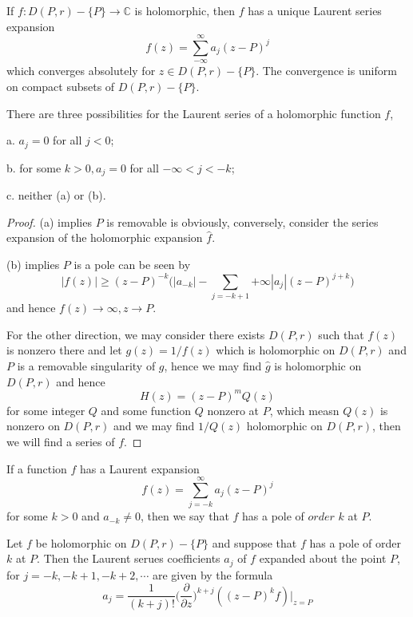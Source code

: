 \documentclass[lang=en, color=blue, ]{elegantbook}
\newcommand{\C}{\mathbb{C}}
\newcommand{\ParZ}{\dfrac{\partial}{\partial z}}
\begin{document}
\begin{proposition}
    If $f:D(P,r)-\{P\}\to\C$ is holomorphic, then $f$ has a unique Laurent series expansion
    \[f(z) = \sum_{-\infty}^{\infty}a_j(z-P)^j\]
    which converges absolutely for $z\in D(P,r)-\{P\}$. The convergence is uniform on compact subsets of $D(P,r)-\{P\}$.
\end{proposition}

\begin{proposition}
    There are three possibilities for the Laurent series of a holomorphic function $f$,\par
    a. $a_j = 0$ for all $j<0$;\par
    b. for some $k>0,a_j=0$ for all $-\infty < j < -k$;\par
    c. neither (a) or (b).
\end{proposition}
\begin{proof}\par
    (a) implies $P$ is removable is obviously, conversely, consider the series expansion of  the holomorphic expansion $\hat{f}$.\par
    (b) implies $P$ is a pole can be seen by
    \[
    |f(z)| \geq (z-P)^{-k}\Big(|a_{-k}| - \sum\limits_{j=-k+1}{+\infty} |a_j|(z-P)^{j+k}\Big)
    \]
    and hence $f(z)\to \infty, z\to P$.\par
    For the other direction, we may consider there exists $D(P,r)$ such that $f(z)$ is nonzero there and let $g(z) = 1/f(z)$ which is holomorphic on $D(P,r)$ and $P$ is a removable singularity of $g$, hence we may find $\hat{g}$ is holomorphic on $D(P,r)$ and hence
    \[
    H(z) = (z-P)^mQ(z)
    \]
    for some integer $Q$ and some function $Q$ nonzero at $P$, which measn $Q(z)$ is nonzero on $D(P,r)$ and we may find $1/Q(z)$ holomorphic on $D(P,r)$, then we will find a series of $f$.
\end{proof}

\begin{definition}
    If a function $f$ has a Laurent expansion
    \[f(z) = \sum_{j=-k}^{\infty}a_j(z-P)^j\]
    for some $k>0$ and $a_{-k}\neq 0$, then we say that $f$ has a pole of $order$ $k$ at $P$.
\end{definition}

\begin{proposition}
    Let $f$ be holomorphic on $D(P,r)-\{P\}$ and suppose that $f$ has a pole of order $k$ at $P$. Then the Laurent serues coefficients $a_j$ of $f$ expanded about the point $P$, for $j=-k,-k+1,-k+2,\cdots$ are given by the formula
    \[
    a_j = \dfrac{1}{(k+j)!}\Big(\ParZ\Big)^{k+j}((z-P)^k f)|_{z=P}
    \]
\end{proposition}
\end{document}
